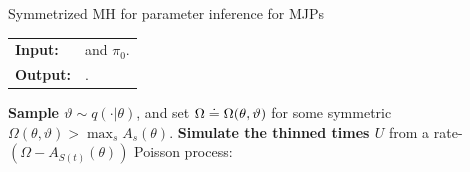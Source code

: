 \begin{algorithm}[H]
   \caption{Symmetrized MH for parameter inference for MJPs }
   \label{alg:MH_improved}
  \begin{tabular}{l l}
   \textbf{Input:  } & \text{The observations $X$,}
                      \text{the MJP path $S(t) = (s_0, S, T)$, parameters $\theta$} and $\pi_0$.\\ 
   \textbf{Output:  }& \text{A new MJP trajectory $S'(t) = (s'_0, S', T')$, 
                            new MJP parameters $\theta'$}.\\
   \hline
   \end{tabular}
   \begin{algorithmic}[1]
     \State \textbf{Sample $\vartheta \sim q(\cdot| \theta)$}, and 
      set %
	$\Omega \doteq \Omega(\theta,\vartheta)$ %
    for some symmetric $\Omega(\theta,\vartheta) > \max_s A_s(\theta)$.
    \State \textbf{Simulate the thinned times $U$} from a rate-$(\Omega-A_{S(t)}(\theta))$ Poisson process:


\end{algorithmic}
\end{algorithm}
